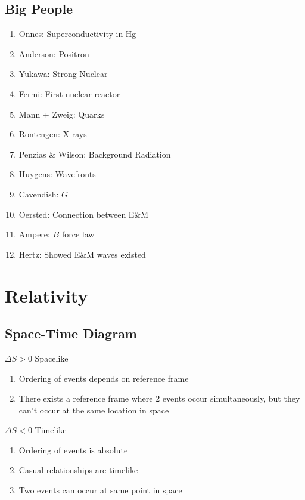 \documentclass[10pt,letter]{article}
\begin{document}
\subsection{Big People}
\begin{enumerate}
    \item Onnes: Superconductivity in Hg 
    \item Anderson: Positron
    \item Yukawa: Strong Nuclear
    \item Fermi: First nuclear reactor
    \item Mann + Zweig: Quarks
    \item Rontengen: X-rays
    \item Penzias \& Wilson: Background Radiation
    \item Huygens: Wavefronts
    \item Cavendish: $G$
    \item Oersted: Connection between E\&M
    \item Ampere: $B$ force law
    \item Hertz: Showed E\&M waves existed
\end{enumerate}


\section{Relativity}
\subsection{Space-Time Diagram}

$\Delta S > 0$ Spacelike
\begin{enumerate}
    \item Ordering of events depends on reference frame
    \item There exists a reference frame where 2 events occur simultaneously, but they can't occur at the same location in space
\end{enumerate}
$\Delta S < 0$ Timelike
\begin{enumerate}
    \item Ordering of events is absolute
    \item Casual relationships are timelike
    \item Two events can occur at same point in space
\end{enumerate}
\end{document}
